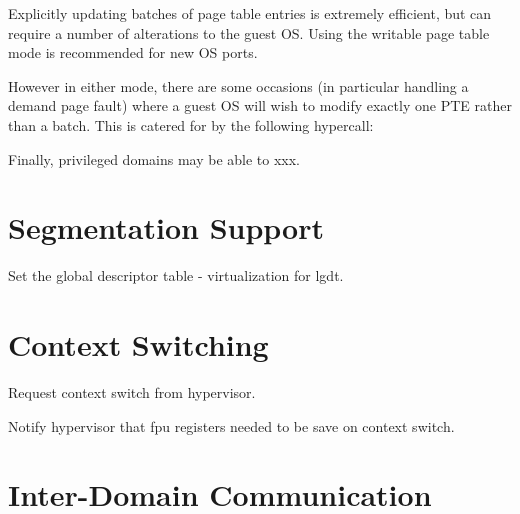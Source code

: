 \documentclass[11pt,twoside,final,openright]{xenstyle}
\begin{document}
Explicitly updating batches of page table entries is extremely
efficient, but can require a number of alterations to the guest 
OS. Using the writable page table mode is recommended 
for new OS ports. 

However in either mode, there are some occasions (in particular
handling a demand page fault) where a guest OS will wish to 
modify exactly one PTE rather than a batch. This is catered 
for by the following hypercall: 

\begin{quote} 

\end{quote} 

Finally, privileged domains may be able to xxx. 

\begin{quote}


\end{quote}

\section{Segmentation Support}



Set the global descriptor table - virtualization for lgdt.





\section{Context Switching} 


Request context switch from hypervisor.



Notify hypervisor that fpu registers needed to be save on context switch.




\section{Inter-Domain Communication}
\label{s:idc} 
\end{document}
